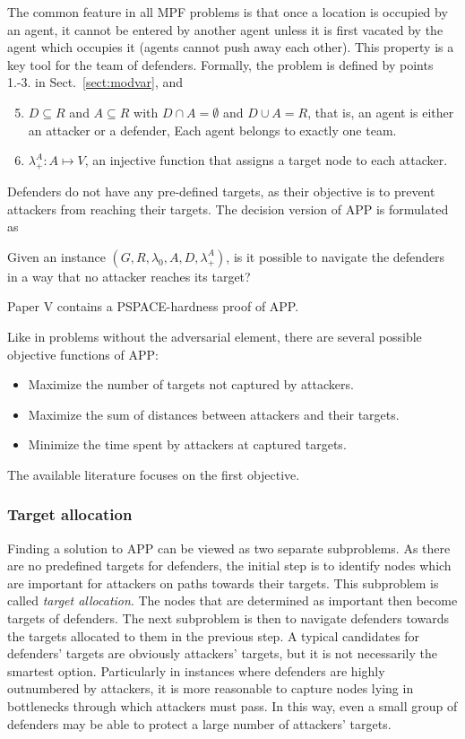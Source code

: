 The common feature in all MPF problems is that once a location is occupied by an agent, 
it cannot be entered by another agent unless it is first vacated by the agent which occupies it (agents cannot push away each other). 
This property is a key tool for the team of defenders.
Formally, the problem is defined by points 1.-3. in Sect.~\ref{sect:modvar}, and
\begin{enumerate}
	\setcounter{enumi}{4}
	\item $D\subseteq R$ and $A\subseteq R$ with $D\cap A=\emptyset$ and $D\cup A=R$, that is, an agent is either an attacker or a defender,
		Each agent belongs to exactly one team. 
	\item $\lambda_+^A:A\mapsto V$, an injective function that assigns a target node to each attacker.
\end{enumerate}

Defenders do not have any pre-defined targets, as their objective is to prevent attackers from reaching their targets.
The decision version of APP is formulated as 
\begin{problem}\label{prob:app}
	Given an instance $(G,R,\lambda_0,A, D, \lambda_+^A)$, is it possible to navigate the defenders in a way that no attacker reaches its target?
\end{problem}
Paper V \cite{ivanova18a} contains a PSPACE-hardness proof of APP.

Like in problems without the adversarial element, there are several possible objective functions of APP:
\begin{itemize}
        \item Maximize the number of targets not captured by attackers.
        \item Maximize the sum of distances between attackers and their targets.
        \item Minimize the time spent by attackers at captured targets.
\end{itemize}
The available literature focuses on the first objective.

\subsubsection{Target allocation}\label{sec:appta}

Finding a solution to APP can be viewed as two separate subproblems.
As there are no predefined targets for defenders, the initial step is to identify nodes which are important  for attackers on paths towards their targets.
This subproblem is called \emph{target allocation}.
The nodes that are determined as important then become targets of defenders.
The next subproblem is then to navigate defenders towards the targets allocated to them in the previous step.
A typical candidates for defenders' targets are obviously attackers' targets, but it is not necessarily the smartest option.
Particularly in instances where defenders are highly outnumbered by attackers, it is more reasonable to capture nodes lying in bottlenecks through which attackers must pass.
In this way, even a small group of defenders may be able to protect a large number of attackers' targets.

